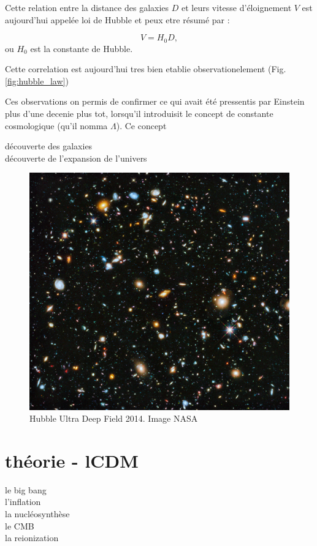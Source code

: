 Cette relation entre la distance des galaxies $D$ et leurs vitesse d'éloignement $V$ est aujourd'hui appelée loi de Hubble et peux etre résumé par :

\begin{equation}
V = H_0 D, 
\end{equation}
 ou $H_0$ est la constante de Hubble.

Cette correlation est aujourd'hui tres bien etablie observationelement (Fig. \ref{fig:hubble_law})

Ces observations on permis de confirmer ce qui avait été pressentis par Einstein plus d'une decenie plus tot, lorsqu'il introduisit le concept de constante cosmologique (qu'il nomma $\Lambda$). 
Ce concept 


découverte des galaxies\\
découverte de l'expansion de l'univers


\begin{figure}[bth]
        \includegraphics[width=.9\linewidth]{img/01/hudf.jpeg} 
        \caption{Hubble Ultra Deep Field 2014. 
        Image NASA}
 		\label{fig:hubbl_deep_field}
\end{figure}

\section{théorie - lCDM}

le big bang\\
l'inflation\\
la nucléosynthèse\\
le CMB\\
la reionization


